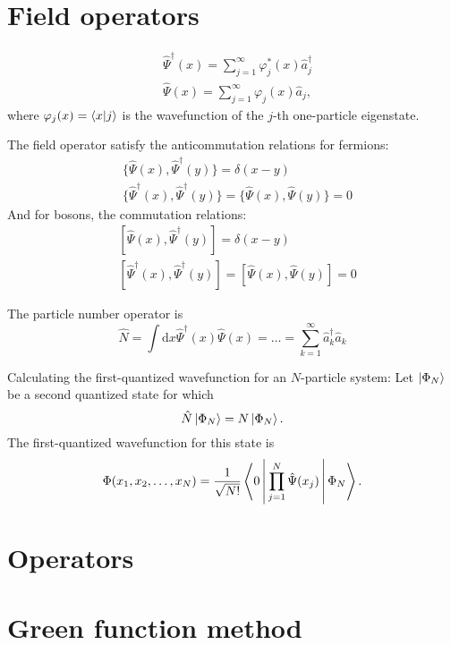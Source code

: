 \documentclass[11pt, a4paper]{article}
\newcommand{\dd}{\mathrm{d}}
\begin{document}
\section{Field operators}
\begin{align*}
    &\hat\Psi^{\dagger}(x) = \sum\limits_{j=1}^{\infty}\varphi^*_j(x)\hat a_j^{\dagger}\\
    &\hat\Psi(x) = \sum\limits_{j=1}^{\infty}\varphi_j(x)\hat a_j,
\end{align*}
where $\varphi_j(x) = \braket{x|j}$ is the wavefunction of the $j$-th one-particle eigenstate.

The field operator satisfy the anticommutation relations for fermions:
\begin{align*}
    &\{\hat\Psi(x),\hat\Psi^{\dagger}(y)\} = \delta(x-y)\\
    &\{\hat\Psi^{\dagger}(x),\hat\Psi^{\dagger}(y)\} = \{\hat\Psi(x),\hat\Psi(y)\} = 0
\end{align*}
And for bosons, the commutation relations:
\begin{align*}
    &[\hat\Psi(x),\hat\Psi^{\dagger}(y)] = \delta(x-y)\\
    &[\hat\Psi^{\dagger}(x),\hat\Psi^{\dagger}(y)] = [\hat\Psi(x),\hat\Psi(y)] = 0
\end{align*}

The particle number operator is 
\begin{equation*}
    \hat N = \int\dd x \hat\Psi^{\dagger}(x)\hat\Psi(x) = \dots = \sum\limits_{k=1}^{\infty}\hat a_k^{\dagger}\hat a_k
\end{equation*}

Calculating the first-quantized wavefunction for an $N$-particle system:
Let $\ket{\Phi_N}$ be a second quantized state for which
\begin{equation*}
    \hat N \ket{\Phi_N} = N \ket{\Phi_N}.
\end{equation*}
The first-quantized wavefunction for this state is 
\begin{equation*}
    \Phi(x_1, x_2, \dots, x_N) = \frac{1}{\sqrt{N!}}\Braket{0| \prod\limits_{j=1}^{N} \hat\Psi(x_j) | \Phi_N }.
\end{equation*}

\section{Operators}

\section{Green function method}
\end{document}
